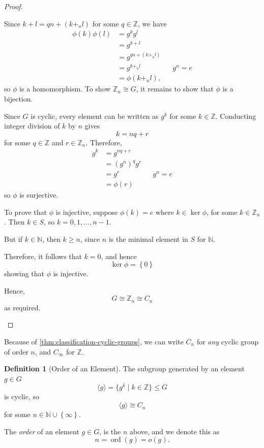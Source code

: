 \documentclass{article}
\theoremstyle{definition}
\newtheorem{definition}[theorem]{Definition}
\theoremstyle{remark}
\newcommand{\pqty}[1]{\left(#1\right)}
\newcommand{\Bqty}[1]{\left\{#1\right\}}
\newcommand{\angBrac}[1]{\langle #1\rangle}
\newcommand{\set}[2]{\{#1\mid #2\}}
\newcommand{\isomorphic}{\cong}
\newcommand{\subgroup}{\leq}
\newcommand{\ZZ}{\mathbb{Z}}
\newcommand{\NN}{\mathbb{N}}
\newcommand{\ord}{\operatorname{ord}}
\begin{document}
\begin{proof}
\begin{itemize}
        Since \(k + l = qn + \pqty{k +_n l}\) for some \(q \in \ZZ\), we have
        \begin{align*}
            \phi \pqty{k} \phi \pqty{l} &= g^k g^l \\
            &= g^{k + l} \\
            &= g^{qn + \pqty{k +_n l}} \\
            &= g^{k +_n l} && g^n = e \\
            &= \phi \pqty{k +_n l},
        \end{align*}
        so \(\phi\) is a homomorphism. To show \(\ZZ_n \isomorphic G\), it remains to show that \(\phi\) is a bijection.

        Since \(G\) is cyclic, every element can be written as \(g^k\) for some \(k \in \ZZ\). Conducting integer division of \(k\) by \(n\) gives
        \[
            k = nq + r
        \]
        for some \(q \in \ZZ\) and \(r \in \ZZ_n\). Therefore,
        \begin{align*}
            g^k &= g^{nq + r} \\
            &= \pqty{g^n}^q g^r \\
            &= g^r && g^n = e \\
            &= \phi\pqty{r}
        \end{align*}
        so \(\phi\) is surjective.

        To prove that \(\phi\) is injective, suppose \(\phi\pqty{k} = e\) where \(k \in \ker \phi\), for some \(k \in \ZZ_{n}\). Then \(k \in S\), so \(k = 0, 1, \ldots, n - 1\).

        But if \(k \in \NN\), then \(k \geq n\), since \(n\) is the minimal element in \(S\) for \(\NN\).

        Therefore, it follows that \(k = 0\), and hence
        \[
            \ker \phi = \Bqty{0}
        \]
        showing that \(\phi\) is injective.

        Hence,
        \[
            G \isomorphic \ZZ_n \isomorphic C_n
        \]
        as required.
    \end{itemize}
\end{proof}

Because of \autoref{thm:classification-cyclic-groups}, we can write \(C_n\) for \emph{any} cyclic group of order \(n\), and \(C_\infty\) for \(\ZZ\).

\begin{definition}[Order of an Element]
    \label{def:order-of-element}%
    The subgroup generated by an element \(g \in G\)
    \[
        \angBrac{g} = \set{g^k}{k \in \ZZ} \subgroup G
    \]
    is cyclic, so
    \[
        \angBrac{g} \isomorphic C_n
    \]
    for some \(n \in \NN \cup \Bqty{\infty}\).

    The \emph{order} of an element \(g \in G\), is the \(n\) above, and we denote this as
    \[
        n = \ord \pqty{g} = o\pqty{g}.
    \]
\end{definition}
\end{document}
